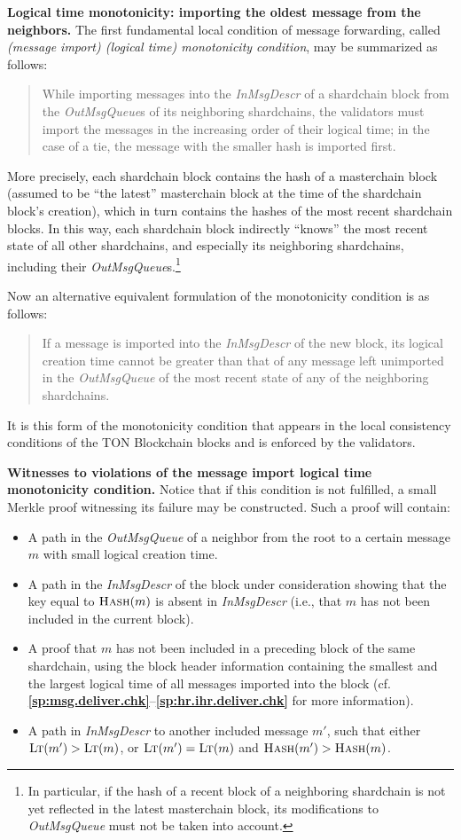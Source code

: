 \documentclass[12pt,oneside]{article}
\def\makepoint#1{\medbreak\noindent{\bf #1.\ }}
\def\nxsubpoint{\refstepcounter{subsubsection}%
  \smallbreak\makepoint{\thesubsubsection}}
\def\refpoint#1{{\rm\textbf{\ref{#1}}}}
\let\ptref=\refpoint
\def\emb#1{\textbf{#1.}}
\def\opsc#1{\operatorname{\textsc{#1}}}
\def\Hash{\opsc{Hash}}
\def\LT{\opsc{Lt}}
\begin{document}
\nxsubpoint\label{sp:monot.import}
\emb{Logical time monotonicity: importing the oldest message from the neighbors}
The first fundamental local condition of message forwarding, called {\em (message import) (logical time) monotonicity condition}, may be summarized as follows:
\begin{quote}
 While importing messages into the {\em InMsgDescr\/} of a shardchain block from the {\em OutMsgQueue\/}s of its neighboring shardchains, the validators must import the messages in the increasing order of their logical time; in the case of a tie, the message with the smaller hash is imported first.
\end{quote}
More precisely, each shardchain block contains the hash of a masterchain block (assumed to be ``the latest'' masterchain block at the time of the shardchain block's creation), which in turn contains the hashes of the most recent shardchain blocks. In this way, each shardchain block indirectly ``knows'' the most recent state of all other shardchains, and especially its neighboring shardchains, including their {\em OutMsgQueue\/}s.\footnote{In particular, if the hash of a recent block of a neighboring shardchain is not yet reflected in the latest masterchain block, its modifications to {\em OutMsgQueue\/} must not be taken into account.}

Now an alternative equivalent formulation of the monotonicity condition is as follows:
\begin{quote}
If a message is imported into the {\em InMsgDescr\/} of the new block, its logical creation time cannot be greater than that of any message left unimported in the {\em OutMsgQueue\/} of the most recent state of any of the neighboring shardchains.
\end{quote}
It is this form of the monotonicity condition that appears in the local consistency conditions of the TON Blockchain blocks and is enforced by the validators.

\nxsubpoint\emb{Witnesses to violations of the message import logical time monotonicity condition}
Notice that if this condition is not fulfilled, a small Merkle proof witnessing its failure may be constructed. Such a proof will contain:
\begin{itemize}
\item A path in the {\em OutMsgQueue\/} of a neighbor from the root to a certain message $m$ with small logical creation time.
\item A path in the {\em InMsgDescr\/} of the block under consideration showing that the key equal to $\Hash(m)$ is absent in {\em InMsgDescr} (i.e., that $m$ has not been included in the current block).
\item A proof that $m$ has not been included in a preceding block of the same shardchain, using the block header information containing the smallest and the largest logical time of all messages imported into the block (cf. \ptref{sp:msg.deliver.chk}--\ptref{sp:hr.ihr.deliver.chk} for more information).
\item A path in {\em InMsgDescr\/} to another included message $m'$, such that either $\LT(m')>\LT(m)$, or $\LT(m')=\LT(m)$ and $\Hash(m')>\Hash(m)$.
\end{itemize}
\end{document}
